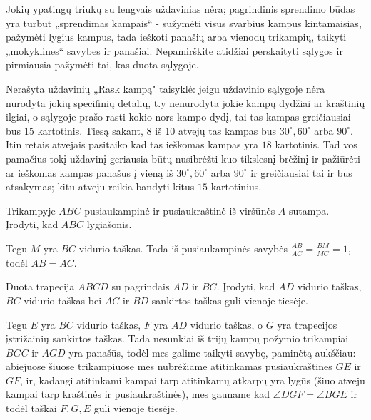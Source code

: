 Jokių ypatingų triukų su lengvais uždavinias nėra;
pagrindinis sprendimo būdas yra turbūt „sprendimas kampais“
- sužymėti visus svarbius kampus kintamaisias, pažymėti
lygius kampus, tada ieškoti panašių arba vienodų trikampių,
taikyti „mokyklines“ savybes ir panašiai. Nepamirškite
atidžiai perskaityti sąlygos  ir pirmiausia pažymėti tai,
kas duota sąlygoje.

Nerašyta uždavinių „Rask kampą" taisyklė: jeigu uždavinio
sąlygoje nėra nurodyta jokių specifinių detalių, t.y
nenurodyta jokie kampų dydžiai ar kraštinių ilgiai, o
sąlygoje prašo rasti kokio nors kampo dydį, tai tas kampas
greičiausiai bus $15$ kartotinis. Tiesą sakant, 8 iš 10
atvejų tas kampas bus $30^\circ, 60^\circ$ arba $90^\circ$.
Itin retais atvejais pasitaiko kad tas ieškomas kampas yra
$18$ kartotinis. Tad vos pamačius tokį uždavinį geriausia
būtų nusibrėžti kuo tikslesnį brėžinį ir pažiūrėti ar
ieškomas kampas panašus į vieną iš $30^\circ, 60^\circ$ arba
$90^\circ$ ir greičiausiai tai ir bus atsakymas; kitu atveju
reikia bandyti kitus $15$ kartotinius.

\begin{pav}
  Trikampyje $ABC$ pusiaukampinė ir pusiaukraštinė iš viršūnės
  $A$ sutampa. Įrodyti, kad $ABC$ lygiašonis.
\end{pav}

\begin{sprendimas}
  Tegu $M$ yra $BC$ vidurio taškas. Tada iš pusiaukampinės savybės
  $\frac{AB}{AC} = \frac{BM}{MC} = 1$, todėl $AB = AC$.
\end{sprendimas}

\begin{pav}
  Duota trapecija $ABCD$ su pagrindais $AD$ ir $BC$. Įrodyti, kad $AD$
  vidurio taškas, $BC$ vidurio taškas bei $AC$ ir $BD$ sankirtos taškas
  guli vienoje tiesėje. 
\end{pav}

\begin{sprendimas}
  Tegu $E$ yra $BC$ vidurio taškas, $F$ yra $AD$ vidurio taškas, o $G$ yra
  trapecijos įstrižainių sankirtos taškas.  Tada nesunkiai iš trijų kampų
  požymio trikampiai $BGC$ ir $AGD$ yra panašūs, todėl mes galime taikyti
  savybę, paminėtą aukščiau: abiejuose šiuose trikampiuose mes nubrėžiame
  atitinkamas pusiaukraštines $GE$ ir $GF$, ir, kadangi atitinkami kampai
  tarp atitinkamų atkarpų yra lygūs (šiuo atveju kampai tarp kraštinės ir
  pusiaukraštinės), mes gauname kad $\angle DGF = \angle BGE$ ir todėl taškai
  $F, G, E$ guli vienoje tiesėje. 
\end{sprendimas}

